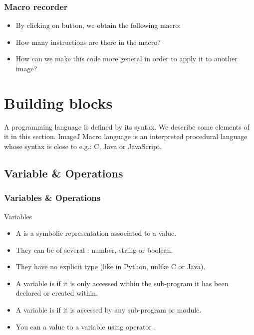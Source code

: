 \begin{frame}[fragile]
  \frametitle<presentation>{Macro recorder}
  \begin{itemize}
    \item By clicking on  button, we obtain the following
    macro:\par
    
    \item How many instructions are there in the macro?
    \item How can we make this code more general in order to apply it to
      another image?
  \end{itemize}
\end{frame}

\section{Building blocks}
A programming language is defined by its syntax. We describe some
elements of it in this section. ImageJ Macro language is an interpreted
procedural language whose syntax is close to e.g.: C, Java or
JavaScript.
\subsection{Variable \& Operations}
\begin{frame}
  \frametitle<presentation>{Variables \& Operations}
  \begin{block}{Variables}
    \begin{itemize}
    \item A  is a symbolic representation associated to a value.
    \item They can be of several : number, string or boolean.
    \item They have no explicit type (like in Python, unlike C or Java).
    \item A variable is  if it is only accessed within the sub-program it has been declared or created within.
    \item A variable is  if it is accessed by any sub-program or module.
    \item You can  a value to a variable using operator \code{=}.
    \end{itemize}
  \end{block}
   \end{frame}
   

